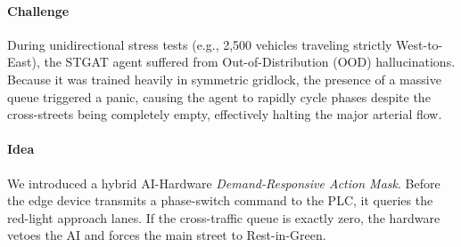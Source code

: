 \documentclass[12pt, onecolumn]{IEEEtran}
\begin{document}
\paragraph{Challenge} During unidirectional stress tests (e.g., 2,500 vehicles traveling strictly West-to-East), the STGAT agent suffered from Out-of-Distribution (OOD) hallucinations. Because it was trained heavily in symmetric gridlock, the presence of a massive queue triggered a panic, causing the agent to rapidly cycle phases despite the cross-streets being completely empty, effectively halting the major arterial flow. \\
\paragraph{Idea} We introduced a hybrid AI-Hardware \textit{Demand-Responsive Action Mask}. Before the edge device transmits a phase-switch command to the PLC, it queries the red-light approach lanes. If the cross-traffic queue is exactly zero, the hardware vetoes the AI and forces the main street to Rest-in-Green.
\end{document}
